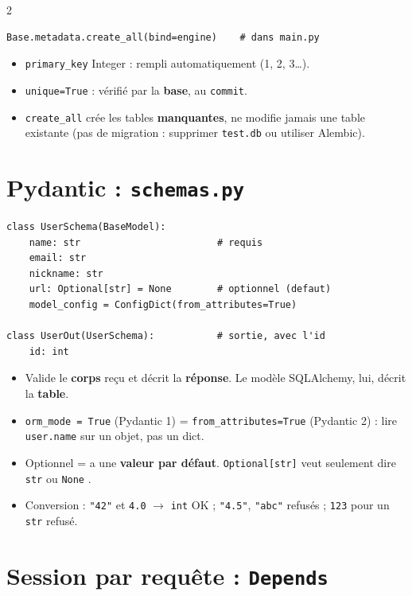 \documentclass[a4paper,10pt]{article}
\newcommand{\co}[1]{\texttt{\textcolor{codefg}{#1}}}
\begin{document}
\begin{multicols}{2}
\begin{lstlisting}
Base.metadata.create_all(bind=engine)    # dans main.py
\end{lstlisting}

\begin{itemize}
  \item \co{primary\_key} Integer : rempli automatiquement (1, 2, 3\dots).
  \item \co{unique=True} : vérifié par la \textbf{base}, au \co{commit}.
  \item \co{create\_all} crée les tables \textbf{manquantes}, ne modifie
        jamais une table existante (pas de migration : supprimer
        \co{test.db} ou utiliser Alembic).
\end{itemize}

\section{Pydantic : \co{schemas.py}}

\begin{lstlisting}
class UserSchema(BaseModel):
    name: str                        # requis
    email: str
    nickname: str
    url: Optional[str] = None        # optionnel (defaut)
    model_config = ConfigDict(from_attributes=True)

class UserOut(UserSchema):           # sortie, avec l'id
    id: int
\end{lstlisting}

\begin{itemize}
  \item Valide le \textbf{corps} reçu et décrit la \textbf{réponse}. Le
        modèle SQLAlchemy, lui, décrit la \textbf{table}.
  \item \co{orm\_mode = True} (Pydantic 1) = \co{from\_attributes=True}
        (Pydantic 2) : lire \co{user.name} sur un objet, pas un dict.
  \item Optionnel = a une \textbf{valeur par défaut}. \co{Optional[str]}
        veut seulement dire \og \co{str} ou \co{None} \fg.
  \item Conversion : \co{"42"} et \co{4.0} $\to$ \co{int} OK ;
        \co{"4.5"}, \co{"abc"} refusés ; \co{123} pour un \co{str} refusé.
\end{itemize}

\section{Session par requête : \co{Depends}}


\end{multicols}
\end{document}

